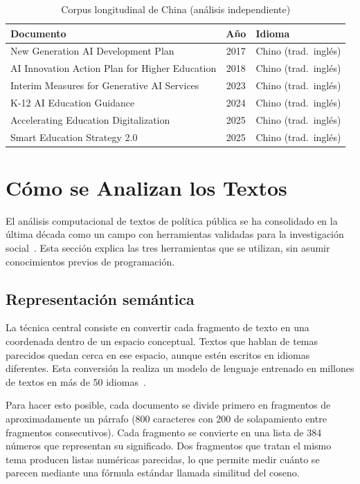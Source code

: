 \begin{table}[htbp]
\centering
\caption{Corpus longitudinal de China (análisis independiente)}
\label{tab:china-longitudinal}
\small
\begin{tabular}{p{8.5cm}cp{2.8cm}}
\hline
\textbf{Documento} & \textbf{Año} & \textbf{Idioma} \\
\hline
New Generation AI Development Plan & 2017 & Chino (trad.\ inglés) \\
AI Innovation Action Plan for Higher Education & 2018 & Chino (trad.\ inglés) \\
Interim Measures for Generative AI Services & 2023 & Chino (trad.\ inglés) \\
K-12 AI Education Guidance & 2024 & Chino (trad.\ inglés) \\
Accelerating Education Digitalization & 2025 & Chino (trad.\ inglés) \\
Smart Education Strategy 2.0 & 2025 & Chino (trad.\ inglés) \\
\hline
\end{tabular}
\end{table}


\section{Cómo se Analizan los Textos}

El análisis computacional de textos de política pública se ha consolidado en la última década como un campo con herramientas validadas para la investigación social~\citep{grimmer2013text}. Esta sección explica las tres herramientas que se utilizan, sin asumir conocimientos previos de programación.

\subsection{Representación semántica}

La técnica central consiste en convertir cada fragmento de texto en una coordenada dentro de un espacio conceptual. Textos que hablan de temas parecidos quedan cerca en ese espacio, aunque estén escritos en idiomas diferentes. Esta conversión la realiza un modelo de lenguaje entrenado en millones de textos en más de 50 idiomas~\citep{reimers2019sentencebert}.

Para hacer esto posible, cada documento se divide primero en fragmentos de aproximadamente un párrafo (800 caracteres con 200 de solapamiento entre fragmentos consecutivos). Cada fragmento se convierte en una lista de 384 números que representan su significado. Dos fragmentos que tratan el mismo tema producen listas numéricas parecidas, lo que permite medir cuánto se parecen mediante una fórmula estándar llamada similitud del coseno.

